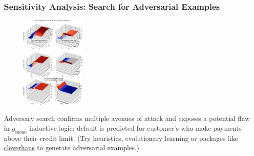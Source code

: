 \documentclass[11pt,
               aspectratio=169,
               hyperref={colorlinks}
               ]{beamer}
\begin{document}
			\begin{frame}[t, allowframebreaks]
				\vspace{-10pt}
				\frametitle{\textbf{Sensitivity Analysis}: Search for Adversarial Examples}
				\begin{figure}
					\begin{center}
						\includegraphics[height=130pt]{../img/sa_max_prob.png}
					\end{center}
				\end{figure}
			
				\tiny{Adversary search confirms multiple avenues of attack and exposes a potential flaw in $g_{\text{mono}}$ inductive logic: default is predicted for customer's who make payments above their credit limit. (Try heuristics, evolutionary learning or packages like \href{https://github.com/tensorflow/cleverhans}{cleverhans} to generate adversarial examples.)}
					
		
			\end{frame}			
			
\end{document}
